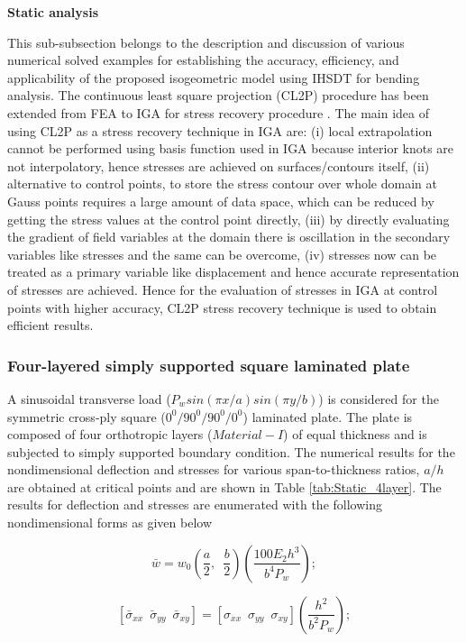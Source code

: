 \documentclass[3p,preprint,12pt]{elsarticle}
\begin{document}
\begin{flushleft}
	\textbf{Static analysis}
\end{flushleft}
This sub-subsection belongs to the description and discussion of various numerical solved examples for establishing the accuracy, efficiency, and applicability of the proposed isogeometric model using IHSDT for bending analysis. The continuous least square projection (CL2P) procedure \cite{hinton1974local} has been extended from FEA to IGA for stress recovery procedure \cite{hassani2012isogeometrical}. The main idea of using CL2P as a stress recovery technique in IGA are: (i) local extrapolation cannot be performed using basis function used in IGA because interior knots are not interpolatory, hence stresses are achieved on surfaces/contours itself, (ii) alternative to control points, to store the stress contour over whole domain at Gauss points requires a large amount of data space, which can be reduced by getting the stress values at the control point directly, (iii) by directly evaluating the gradient of field variables at the domain there is oscillation in the secondary variables like stresses and the same can be overcome, (iv) stresses now can be treated as a primary variable like displacement and hence accurate representation of stresses are achieved. Hence for the evaluation of stresses in IGA at control points with higher accuracy, CL2P stress recovery technique is used to obtain efficient results.

\subsubsection{Four-layered simply supported square laminated plate}\label{4layaredbending}	
A sinusoidal transverse load ($P_w sin(\pi x/a)sin(\pi y/b)$) is considered for the symmetric cross-ply square ($0^0/90^0/90^0/0^0$) laminated plate. The plate is composed of four orthotropic layers ($Material-I$) of equal thickness and is subjected to simply supported boundary condition. The numerical results for the nondimensional deflection and stresses for various span-to-thickness ratios, $a/h$ are obtained at critical points and are shown in Table \ref{tab:Static_4layer}. The results for deflection and stresses are enumerated with the following nondimensional forms as given below

\[
\bar{w}=w_{0}\left(\frac{a}{2},\,\,\,\frac{b}{2}\right)\left(\frac{100E_{2}h^{3}}{b^{4}P_{w}}\right);
\]

\[
\left[\bar{\sigma}_{xx}\,\,\bar{\,\sigma}_{yy}\,\,\,\bar{\sigma}_{xy}\right]=\left[\sigma_{xx}\,\,\,\sigma_{yy}\,\,\,\sigma_{xy}\right]\left(\frac{h^{2}}{b^{2}P_{w}}\right);
\]
\end{document}
